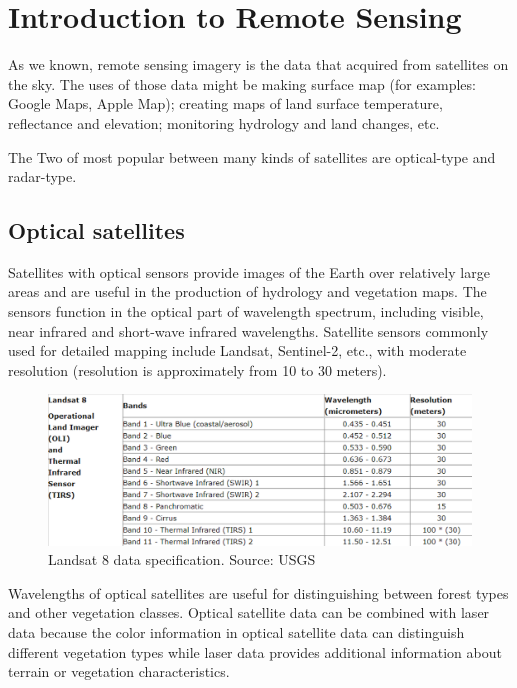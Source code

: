 \section{Introduction to Remote Sensing} %

As we known, remote sensing imagery is the data that acquired from satellites on the sky. The uses of those data might be making surface map (for examples: Google Maps, Apple Map); creating maps of land surface temperature, reflectance and elevation; monitoring hydrology and land changes, etc. 

The Two of most popular between many kinds of satellites are optical-type and radar-type.

\subsection{Optical satellites}

Satellites with optical sensors provide images of the Earth over relatively large areas and are useful in the production of hydrology and vegetation maps. The sensors function in the optical part of wavelength spectrum, including visible, near infrared and short-wave infrared wavelengths. Satellite sensors commonly used for detailed mapping include Landsat, Sentinel-2, etc., with moderate resolution (resolution is approximately from 10 to 30 meters).

\begin{figure}
\centering
\includegraphics[width=0.7\linewidth]{figures/wavelengthL8.png}
\caption[]{Landsat 8 data specification. Source: USGS}
\end{figure}

Wavelengths of optical satellites are useful for distinguishing between forest types and other vegetation classes. Optical satellite data can be combined with laser data because the color information in optical satellite data can distinguish different vegetation types while laser data provides additional information about terrain or vegetation characteristics. 

